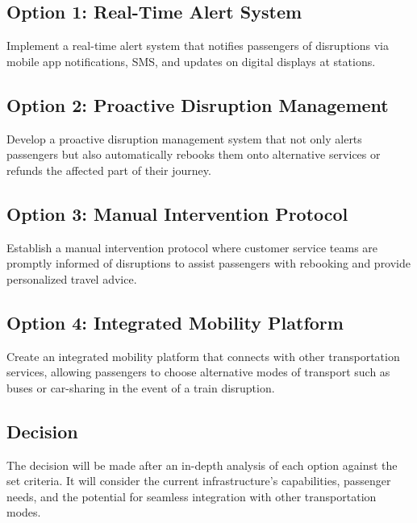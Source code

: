 \subsection*{Option 1: Real-Time Alert System}
Implement a real-time alert system that notifies passengers of disruptions via mobile app notifications, SMS, and updates on digital displays at stations.

\subsection*{Option 2: Proactive Disruption Management}
Develop a proactive disruption management system that not only alerts passengers but also automatically rebooks them onto alternative services or refunds the affected part of their journey.

\subsection*{Option 3: Manual Intervention Protocol}
Establish a manual intervention protocol where customer service teams are promptly informed of disruptions to assist passengers with rebooking and provide personalized travel advice.

\subsection*{Option 4: Integrated Mobility Platform}
Create an integrated mobility platform that connects with other transportation services, allowing passengers to choose alternative modes of transport such as buses or car-sharing in the event of a train disruption.

\subsection*{Decision}
The decision will be made after an in-depth analysis of each option against the set criteria. It will consider the current infrastructure's capabilities, passenger needs, and the potential for seamless integration with other transportation modes.


